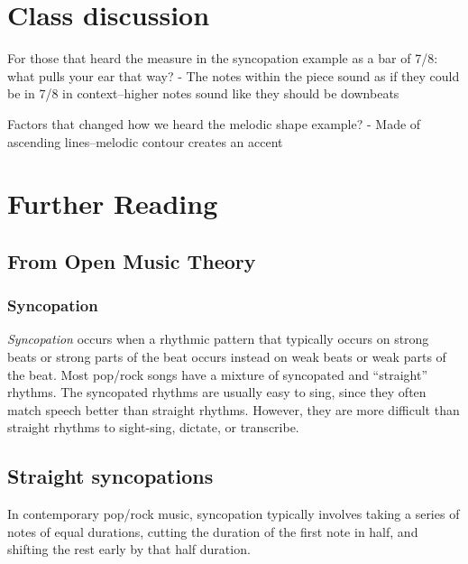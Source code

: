 \documentclass{book}
\begin{document}
\hypertarget{class-discussion-51}{%
\chapter{Class discussion}\label{class-discussion-51}}

For those that heard the measure in the syncopation example as a bar of 7/8:
what pulls your ear that way? - The notes within the piece sound as if they
could be in 7/8 in context--higher notes sound like they should be downbeats

Factors that changed how we heard the melodic shape example? - Made of
ascending lines--melodic contour creates an accent

\hypertarget{further-reading-27}{%
\chapter{Further Reading}\label{further-reading-27}}

\hypertarget{from-open-music-theory-26}{%
\section{From Open Music Theory}\label{from-open-music-theory-26}}

\hypertarget{syncopation-1}{%
\subsection{Syncopation}\label{syncopation-1}}

\emph{Syncopation} occurs when a rhythmic pattern that typically occurs on
strong beats or strong parts of the beat occurs instead on weak beats or weak
parts of the beat. Most pop/rock songs have a mixture of syncopated and
``straight'' rhythms. The syncopated rhythms are usually easy to sing, since
they often match speech better than straight rhythms. However, they are more
difficult than straight rhythms to sight-sing, dictate, or transcribe.

\hypertarget{straight-syncopations}{%
\section{Straight syncopations}\label{straight-syncopations}}

In contemporary pop/rock music, syncopation typically involves taking a series
of notes of equal durations, cutting the duration of the first note in half,
and shifting the rest early by that half duration.
\end{document}
